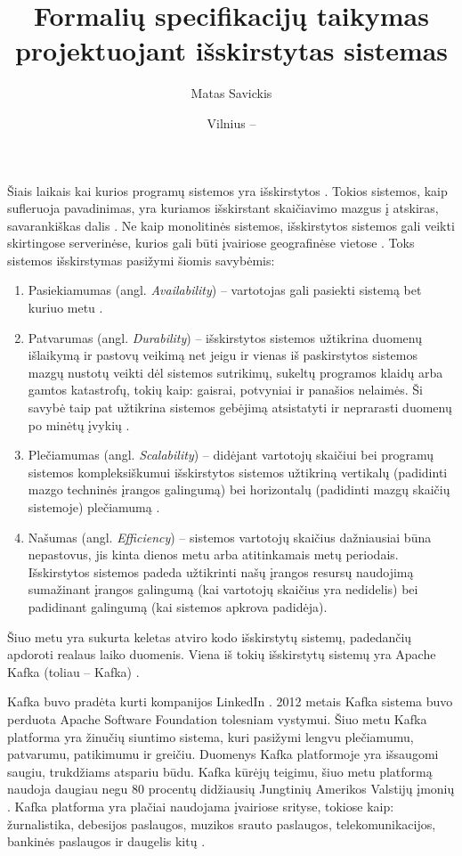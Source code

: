 \documentclass{VUMIFPSmagistrinis}
\title{Formalių specifikacijų taikymas projektuojant išskirstytas sistemas}
\author{Matas Savickis}
\date{Vilnius – \the\year}
\begin{document}

\maketitle
\setcounter{page}{2}
\tableofcontents




		Šiais laikais kai kurios programų sistemos yra išskirstytos \cite{mcr}. 
		Tokios sistemos, kaip sufleruoja pavadinimas, yra kuriamos išskirstant skaičiavimo mazgus į atskiras, savarankiškas dalis \cite{coulouris2005distributed}.
		Ne kaip monolitinės sistemos, išskirstytos sistemos gali veikti skirtingose serverinėse, kurios gali būti įvairiose geografinėse vietose \cite{shirriff2006method}.
		Toks sistemos išskirstymas pasižymi šiomis savybėmis:
		\begin{enumerate}
			\item{Pasiekiamumas (angl. {\it Availability}) -- vartotojas gali pasiekti sistemą bet kuriuo metu \cite{180327}.}
			\item{Patvarumas (angl. {\it Durability}) -- išskirstytos sistemos užtikrina duomenų išlaikymą ir pastovų veikimą net jeigu ir vienas iš paskirstytos sistemos mazgų nustotų veikti dėl sistemos sutrikimų, sukeltų programos klaidų arba gamtos katastrofų, tokių kaip: gaisrai, potvyniai ir panašios nelaimės. Ši savybė taip pat užtikrina sistemos gebėjimą atsistatyti ir neprarasti duomenų po minėtų įvykių \cite{5470366}.}
			\item{Plečiamumas (angl. {\it Scalability}) -- didėjant vartotojų skaičiui bei programų sistemos kompleksiškumui išskirstytos sistemos užtikriną vertikalų (padidinti mazgo techninės įrangos galingumą) bei horizontalų (padidinti mazgų skaičių sistemoje) plečiamumą \cite{862209}.}
			\item{Našumas (angl. {\it Efficiency}) -- sistemos vartotojų skaičius dažniausiai būna nepastovus, jis kinta dienos metu arba atitinkamais metų periodais. Išskirstytos sistemos padeda užtikrinti našų įrangos resursų naudojimą sumažinant įrangos galingumą (kai vartotojų skaičius yra nedidelis) bei padidinant galingumą (kai sistemos apkrova padidėja).}
		\end{enumerate}
		Šiuo metu yra sukurta keletas atviro kodo išskirstytų sistemų, padedančių apdoroti realaus laiko duomenis.	
		Viena iš tokių išskirstytų sistemų yra Apache Kafka (toliau -- Kafka) \cite{kfk}.


 		Kafka buvo pradėta kurti kompanijos LinkedIn \cite{kfk}.
		2012 metais Kafka sistema buvo perduota Apache Software Foundation tolesniam vystymui.
		Šiuo metu Kafka platforma yra žinučių siuntimo sistema, kuri pasižymi lengvu plečiamumu, patvarumu, patikimumu ir greičiu.
		Duomenys Kafka platformoje yra išsaugomi saugiu, trukdžiams atspariu būdu.
		Kafka kūrėjų teigimu, šiuo metu platformą naudoja daugiau negu 80 procentų didžiausių Jungtinių Amerikos Valstijų įmonių \cite{kfk}.
		Kafka platforma yra plačiai naudojama įvairiose srityse, tokiose kaip: žurnalistika, debesijos paslaugos, muzikos srauto paslaugos, telekomunikacijos, bankinės paslaugos ir daugelis kitų \cite{kfk}.
\end{document}
